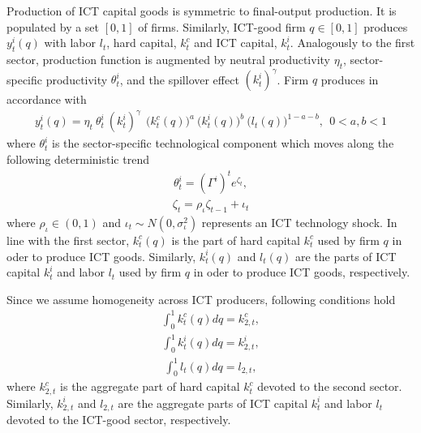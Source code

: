 \documentclass[12pt]{article}
\begin{document}
Production of ICT capital goods is symmetric to final-output production. It is populated by a set $[0,1]$ of firms. Similarly, ICT-good firm $q \in [0,1]$ produces $y^i_t(q)$ with labor $l_{t}$, hard capital, $k^c_{t}$ and ICT capital, $k^i_{t}$. Analogously to the first sector, production function is augmented by neutral productivity $\eta_t$, sector-specific productivity $\theta^i_t$, and the spillover effect $(k^i_{t})^{\gamma}$. Firm $q$ produces in accordance with
\begin{eqnarray}\label{equation:productionICT}
y^i_t(q) = \eta_t \ \theta^i_t \ (k^i_{t})^{\gamma} \ \ \big( k^c_{t}(q) \big)^a \ \big( k^i_{t}(q) \big)^b \ \big( l_{t}(q) \big)^{1-a-b}, \ \ 0 < a,b < 1
\end{eqnarray}
where $\theta^i_t$ is the sector-specific technological component which moves along the following deterministic trend
\begin{eqnarray}\label{equation:ICT_tech_process}
\theta^i_t = (\Gamma^{i})^t e^{\zeta_t},  
\end{eqnarray} 
\begin{eqnarray}\label{equation:ICT_tech_shock}
\zeta_t = \rho_{\iota} \zeta_{t-1} + \iota_t
\end{eqnarray} 
where $\rho_{\iota} \in (0,1)$ and $\iota_t \sim N(0,\sigma_{\iota}^2)$ represents an ICT technology shock. In line with the first sector, $k^c_{t}(q)$ is the part of hard capital $k^c_t$ used by firm $q$ in oder to produce ICT goods. Similarly, $k^i_{t}(q)$ and $l_{t}(q)$ are the parts of ICT capital $k^i_t$ and labor $l_t$ used by firm $q$ in oder to produce ICT goods, respectively. 

Since we assume homogeneity across ICT producers, following conditions hold
\begin{eqnarray}\label{equation:aggregation_hard_ICTsec}
\int_0^1 k^c_{t}(q) dq = k^c_{2,t},
\end{eqnarray}
\begin{eqnarray}\label{equation:aggregation_ICT_ICTsec}
\int_0^1 k^i_{t}(q) dq = k^i_{2,t}, 
\end{eqnarray}
\begin{eqnarray}\label{equation:aggregation_labor_ICTsec}
\int_0^1 l_{t}(q) dq = l_{2,t},
\end{eqnarray}
where $k^c_{2,t}$ is the aggregate part of hard capital $k^c_t$ devoted to the second sector. Similarly, $k^i_{2,t}$ and $l_{2,t}$ are the aggregate parts of ICT capital $k^i_{t}$ and labor $l_{t}$ devoted to the ICT-good sector, respectively. 
\end{document}
